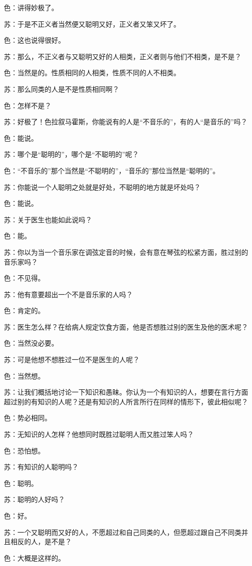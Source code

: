 \documentclass[11pt,oneside]{book}
\begin{document}
\begin{common-format}
色：讲得妙极了。

苏：于是不正义者当然便又聪明又好，正义者又笨又坏了。

色：这也说得很好。

苏：那么，不正义者与又聪明又好的人相类，正义者则与他们不相类，是不是？

色：当然是的。性质相同的人相类，性质不同的人不相类。

苏：那么同类的人是不是性质相同啊？

色：怎样不是？

苏：好极了！色拉叙马霍斯，你能说有的人是“不音乐的”，有的人“是音乐的”吗？

色：能说。

苏：哪个是“聪明的”，哪个是“不聪明的”呢？

色：“不音乐的”那个当然是“不聪明的”，“音乐的”那位当然是“聪明的”。

苏：你能说一个人聪明之处就是好处，不聪明的地方就是坏处吗？

色：能说。

苏：关于医生也能如此说吗？

色：能。

苏：你以为当一个音乐家在调弦定音的时候，会有意在琴弦的松紧方面，胜过别的音乐家吗？

色：不见得。

苏：他有意要超出一个不是音乐家的人吗？

色：肯定的。

苏：医生怎么样？在给病人规定饮食方面，他是否想胜过别的医生及他的医术呢？

色：当然没必要。

苏：可是他想不想胜过一位不是医生的人呢？

色：当然想。

苏：让我们概括地讨论一下知识和愚昧。你认为一个有知识的人，想要在言行方面超过别的有知识的人呢？还是有知识的人所言所行在同样的情形下，彼此相似呢？

色：势必相同。

苏：无知识的人怎样？他想同时既胜过聪明人而又胜过笨人吗？

色：恐怕想。

苏：有知识的人聪明吗？

色：聪明。

苏：聪明的人好吗？

色：好。

苏：一个又聪明而又好的人，不愿超过和自己同类的人，但愿超过跟自己不同类并且相反的人，是不是？

色：大概是这样的。


\end{common-format}
\end{document}
